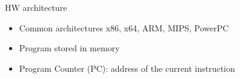 \documentclass{beamer}
\begin{document}
\begin{frame}[t]{HW architecture}
  \begin{itemize}
  \item Common architectures x86, x64, ARM, MIPS, PowerPC
  \item<3-> Program stored in memory
  \item<4-> Program Counter (PC): address of the current instruction
  \end{itemize}
\end{frame}
\end{document}
